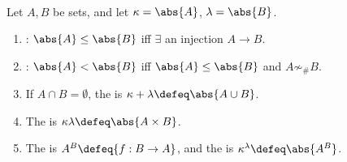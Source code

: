 \begin{definition} \label{def:cardinal-comparison-and-arithmetic} \\
Let $A,B$ be sets, and let $\kappa=\abs{A}$, $\lambda=\abs{B}$.
\begin{enumerate}[label=(\roman*)]
\setlength{\itemsep}{0pt}
\item {}: $\abs{A}\leq\abs{B}$ iff $\exists$ an injection $A\to B$.
\item {}: $\abs{A}<\abs{B}$ iff $\abs{A}\leq\abs{B}$ and $A\not\sim_{\#}B$.
\item If $A\cap B=\emptyset$, the  is $\kappa+\lambda\defeq\abs{A\cup B}$.
\item The  is $\kappa\lambda\defeq\abs{A\times B}$.
\item The  is $A^B\defeq\{f:B\to A\}$, and the  is $\kappa^\lambda\defeq\abs{A^B}$.
\end{enumerate}
\end{definition}
